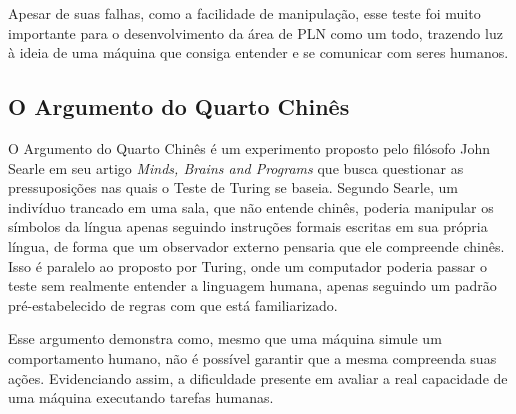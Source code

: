 \documentclass[cic,tc]{iiufrgs}
\begin{document}
Apesar de suas falhas, como a facilidade de manipulação, esse teste foi muito importante para o desenvolvimento da área de PLN como um todo, trazendo luz à ideia de uma máquina que consiga entender e se comunicar com seres humanos.

\subsection{O Argumento do Quarto Chinês}
O Argumento do Quarto Chinês é um experimento proposto pelo filósofo John Searle em seu artigo \textit{Minds, Brains and Programs} \cite{searle1980minds} que busca questionar as pressuposições nas quais o Teste de Turing \cite{alan1950a} se baseia. Segundo Searle, um indivíduo trancado em uma sala, que não entende chinês, poderia manipular os símbolos da língua apenas seguindo instruções formais escritas em sua própria língua, de forma que um observador externo pensaria que ele compreende chinês. Isso é paralelo ao proposto por Turing, onde um computador poderia passar o teste sem realmente entender a linguagem humana, apenas seguindo um padrão pré-estabelecido de regras com que está familiarizado.

Esse argumento demonstra como, mesmo que uma máquina simule um comportamento humano, não é possível garantir que a mesma compreenda suas ações. Evidenciando assim, a dificuldade presente em avaliar a real capacidade de uma máquina executando tarefas humanas.


\end{document}

